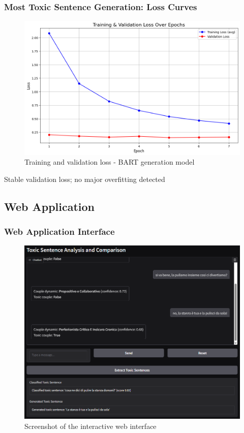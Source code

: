\documentclass[aspectratio=169,xcolor=dvipsnames]{beamer}
\begin{document}
\begin{frame}
\frametitle{Most Toxic Sentence Generation: Loss Curves}

\begin{figure}
\centering
\includegraphics[width=0.6\linewidth]{figures/bart_toxic_loss_curves.png}
\caption{Training and validation loss - BART generation model}
\end{figure}

\vspace{0.1cm}
\begin{center}
\colorbox{yellow!10}{\parbox{0.75\linewidth}{\centering Stable validation loss; no major overfitting detected}}
\end{center}

\end{frame}

\subsection{Web Application}

\begin{frame}
\frametitle{Web Application Interface}

\begin{figure}
\centering
\includegraphics[width=0.55\linewidth]{figures/web_app_interface_used.png}
\caption{Screenshot of the interactive web interface}
\end{figure}

\end{frame}
\end{document}
